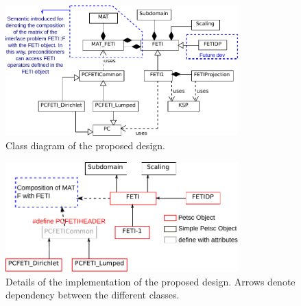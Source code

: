 \documentclass[a4paper,11pt]{report}
\begin{document}
\begin{figure}[hb]
 \centering
\includegraphics[width=0.8\textwidth]{figures/einsDesign/ClassDiagram.pdf}
\caption{Class diagram of the proposed design.}
\label{fg:classDiagram}
\end{figure}

\begin{figure}[hb]
 \centering
\includegraphics[width=0.8\textwidth]{figures/einsDesign/einsComponents.pdf}
\caption{Details of the implementation of the proposed design. Arrows
  denote dependency between the different classes.}
\label{fg:einsComponents}
\end{figure}
\end{document}
